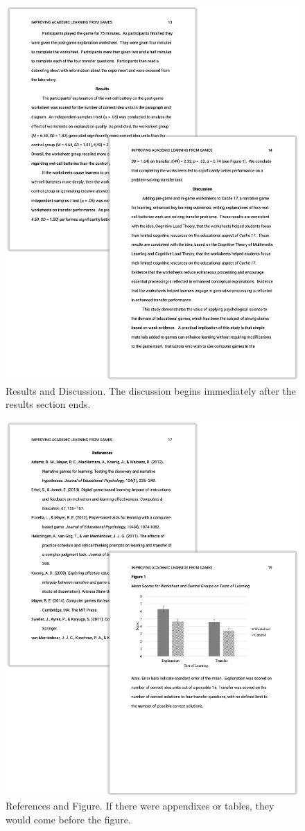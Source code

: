 \documentclass[
]{krantz}
\begin{document}
\begin{figure}

{\centering \includegraphics[width=0.65\linewidth]{images/ch11/sample3} 

}

\caption{Results and Discussion. The discussion begins immediately after the results section ends.}\label{fig:sample3}
\end{figure}

\begin{figure}

{\centering \includegraphics[width=0.65\linewidth]{images/ch11/sample4} 

}

\caption{References and Figure. If there were appendixes or tables, they would come before the figure.}\label{fig:sample4}
\end{figure}
\end{document}
